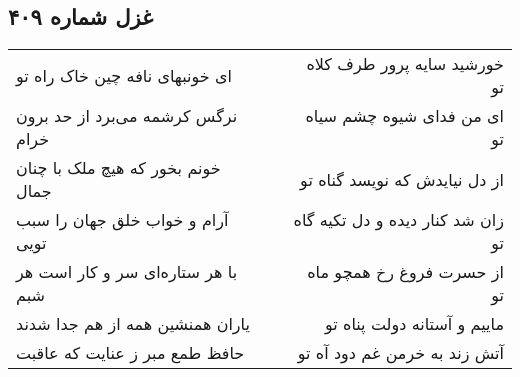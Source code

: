 \begin{center}
\section*{غزل شماره ۴۰۹}
\label{sec:sh409}
\begin{longtable}{l p{0.5cm} r}
ای خونبهای نافه چین خاک راه تو
&&
خورشید سایه پرور طرف کلاه تو
\\
نرگس کرشمه می‌برد از حد برون خرام
&&
ای من فدای شیوه چشم سیاه تو
\\
خونم بخور که هیچ ملک با چنان جمال
&&
از دل نیایدش که نویسد گناه تو
\\
آرام و خواب خلق جهان را سبب تویی
&&
زان شد کنار دیده و دل تکیه گاه تو
\\
با هر ستاره‌ای سر و کار است هر شبم
&&
از حسرت فروغ رخ همچو ماه تو
\\
یاران همنشین همه از هم جدا شدند
&&
ماییم و آستانه دولت پناه تو
\\
حافظ طمع مبر ز عنایت که عاقبت
&&
آتش زند به خرمن غم دود آه تو
\\
\end{longtable}
\end{center}
